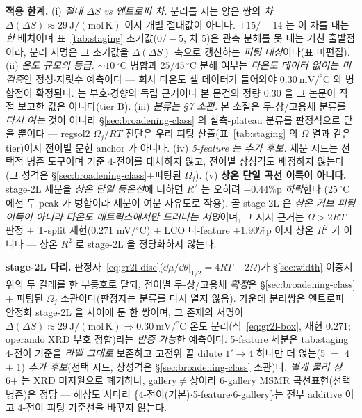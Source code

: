 \begin{warnbox}
\textbf{적용 한계.} (i) \emph{절대 $\Delta S$ vs 엔트로피 \emph{차}.} 분리를 지는 양은 쌍의 \emph{차}
$\Delta(\Delta S)\approx29\ \mathrm{J/(mol\,K)}$ 이지 개별 절대값이 아니다. $+15/-14$ 는 이 차를 내는 \emph{한}
배치이며 표~\ref{tab:staging} 초기값($0/-5$, 차 $5$)은 관측 분해를 못 내는 거친 출발점이라, 분리 서명은 그
초기값을 $\Delta(\Delta S)$ 축으로 갱신하는 \emph{피팅 대상}이다(표 미편집). (ii) \emph{온도 규모의 등급.}
$\sim10\,^\circ$C 병합과 $25/45\,^\circ$C 분해 여부는 \emph{다온도 데이터 없이는 미검증}인 정성$\cdot$자릿수
예측이다 --- 회사 다온도 셀 데이터가 들어와야 $0.30\ \mathrm{mV/^\circ C}$ 와 병합점이 확정된다.
\cite{schmitt2022} 는 부호$\cdot$경향의 독립 근거이나 본 문건의 정량 $0.30$ 을 그 논문이 직접 보고한 값은
아니다(tier B). (iii) \emph{분류는 §7 소관.} 본 소절은 두-상/고용체 분류를 \emph{다시 여는} 것이 아니라
\S\ref{sec:broadening-class} 의 실측-plateau 분류를 판정식으로 닫을 뿐이다 --- regsol2 $\Omega_j/RT$ 진단은 우리
피팅 산출(표~\ref{tab:staging} 의 $\Omega$ 열과 같은 tier)이지 전이별 문헌 anchor 가 아니다. (iv) \emph{5-feature
는 추가 후보.} 세분 시드는 선택적 병존 도구이며 기준 4-전이를 대체하지 않고, 전이별 상성격도 배정하지 않는다
(그 성격은 \S\ref{sec:broadening-class}$+$피팅된 $\Omega_j$). (v) \textbf{상온 단일 곡선
이득이 아니다.} stage-2L 세분을 \emph{상온 단일 등온선}에 더하면 $R^2$ 는 오히려 $-0.44\%$p \emph{하락}한다
($25\,^\circ$C 에선 두 peak 가 병합이라 세분이 여분 자유도로 작용). 곧 stage-2L 은 \emph{상온 커브 피팅 이득이
아니라 다온도 매트릭스에서만 드러나는 서명}이며, 그 지지 근거는 $\Omega>2RT$ 판정 $+$ T-split 재현($0.271$
mV/$^\circ$C) $+$ LCO 다-feature $+1.90\%$p 이지 상온 $R^2$ 가 아니다 --- 상온 $R^2$ 로 stage-2L 을 정당화하지 않는다.
\end{warnbox}

\begin{keybox}
\textbf{stage-2L 다리.} 판정자~\eqref{eq:gr2l-disc}($\dd\mu/\dd\theta|_{1/2}=4RT-2\Omega$)가 \S\ref{sec:width}
이중지위의 두 갈래를 한 부등호로 닫되, 전이별 두-상/고용체 \emph{확정}은 \S\ref{sec:broadening-class} $+$ 피팅된
$\Omega_j$ 소관이다(판정자는 분류를 다시 열지 않음). 가운데 분리쌍은 엔트로피 안정화 stage-2L 을 사이에 둔 한
쌍이며, 그 존재의 서명이 $\Delta(\Delta S)\approx29\ \mathrm{J/(mol\,K)}\Rightarrow0.30\ \mathrm{mV/^\circ C}$
온도 분리(식~\eqref{eq:gr2l-box}, 재현 $0.271$; operando XRD 부호 정합\cite{schmitt2022})라는 \emph{반증 가능}한
예측이다. 5-feature 세분은 tab:staging 4-전이 기준을 \emph{라벨 그대로} 보존하고 고전위 끝 dilute $1'\!\to\!4$
하나만 더 얹는(5 $=$ 4 $+$ 1) \emph{추가 후보}(선택 시드, 상성격은 \S\ref{sec:broadening-class} 소관)다. \emph{별개 물리 상}
6+ 는 XRD 미지원으로 폐기하나, gallery$\ne$상이라 6-gallery MSMR 곡선표현(선택 병존)은
정당 --- 해상도 사다리 \{4-전이(기본)$\cdot$5-feature$\cdot$6-gallery\}는 전부 additive 이고 4-전이 피팅 기준선을 바꾸지 않는다.
\end{keybox}

